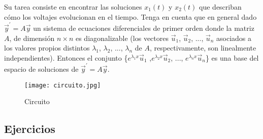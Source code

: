 \begin{answers}
  Su tarea consiste en encontrar las soluciones $x_1(t)$ y $x_2(t)$ que describan cómo los voltajes evolucionan  en el tiempo. Tenga en cuenta que en general dado $\vec{y}^{\prime}=A\vec{y}$ un sistema de ecuaciones diferenciales de primer orden donde la matriz $A$, de dimensi\'on $n \times  n$ es diagonalizable (los vectores $\vec{u}_1$, $\vec{u}_2$, ..., $\vec{u}_n$
 asociados a los valores propios distintos  $\lambda_1$, $\lambda_2$, ..., $\lambda_n$ de $A$,  respectivamente,  son  linealmente independientes). 
 Entonces el conjunto \{$e^{\lambda_1x}\vec{u}_1$ ,$e^{\lambda_2x}\vec{u}_2$, ..., $e^{\lambda_nx}\vec{u}_n$\} es una base 
 del espacio de soluciones de  $\vec{y}^{\prime}=A\vec{y}$.

\begin{figure}[ht!]
	\centering
			\texttt{[image: circuito.jpg]}
     \caption{Circuito}
         \label{cir}
 \end{figure}

\end{answers}


\bigskip

\subsection{Ejercicios}

\bigskip




